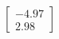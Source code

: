 \documentclass[preview]{standalone}
\begin{document}
\begin{align*}
\begin{bmatrix} -4.97 \\ 2.98 \end{bmatrix}
\end{align*}
\end{document}
